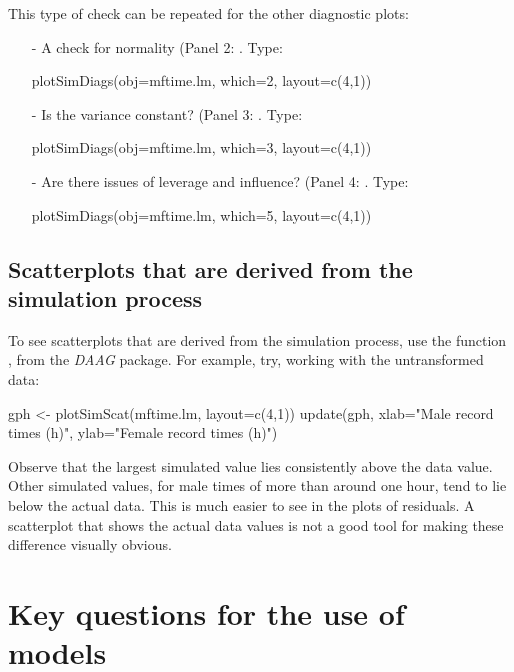 This type of check can be repeated for the other diagnostic plots:
\begin{itemize}
  \item [-] A check for normality (Panel 2: .  Type:
\begin{Schunk}
\begin{Sinput}
plotSimDiags(obj=mftime.lm, which=2, layout=c(4,1))
\end{Sinput}
\end{Schunk}
\item[-] Is the variance constant? (Panel 3: .  Type:
\begin{Schunk}
\begin{Sinput}
plotSimDiags(obj=mftime.lm, which=3, layout=c(4,1))
\end{Sinput}
\end{Schunk}
\item[-]  Are there issues of leverage and influence? (Panel 4:
  .  Type:
\begin{Schunk}
\begin{Sinput}
plotSimDiags(obj=mftime.lm, which=5, layout=c(4,1))
\end{Sinput}
\end{Schunk}
\end{itemize}

\subsection*{Scatterplots that are derived from the simulation process}

To see scatterplots that are derived from the simulation process,
use the function , from the {\em DAAG} package.
For example, try, working with the untransformed data:
\begin{Schunk}
\begin{Sinput}
gph <- plotSimScat(mftime.lm, layout=c(4,1))
update(gph, xlab="Male record times (h)",
       ylab="Female record times (h)")
\end{Sinput}
\end{Schunk}
Observe that the largest simulated value lies consistently above the
data value. Other simulated values, for male times of more than around
one hour, tend to lie below the actual data.  This is much easier to
see in the plots of residuals.  A scatterplot that shows the actual
data values is not a good tool for making these difference
visually obvious.

 \section{Key questions for the use of models}

